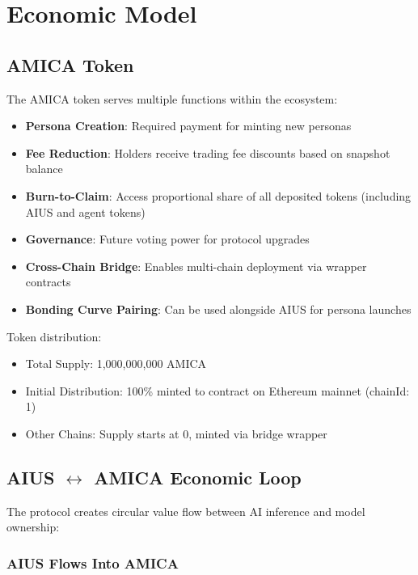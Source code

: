 \documentclass{article}
\begin{document}
\section{Economic Model}

\subsection{AMICA Token}

The AMICA token serves multiple functions within the ecosystem:

\begin{itemize}
    \item \textbf{Persona Creation}: Required payment for minting new personas
    \item \textbf{Fee Reduction}: Holders receive trading fee discounts based on snapshot balance
    \item \textbf{Burn-to-Claim}: Access proportional share of all deposited tokens (including AIUS and agent tokens)
    \item \textbf{Governance}: Future voting power for protocol upgrades
    \item \textbf{Cross-Chain Bridge}: Enables multi-chain deployment via wrapper contracts
    \item \textbf{Bonding Curve Pairing}: Can be used alongside AIUS for persona launches
\end{itemize}

Token distribution:
\begin{itemize}
    \item Total Supply: 1,000,000,000 AMICA
    \item Initial Distribution: 100\% minted to contract on Ethereum mainnet (chainId: 1)
    \item Other Chains: Supply starts at 0, minted via bridge wrapper
\end{itemize}

\subsection{AIUS $\leftrightarrow$ AMICA Economic Loop}

The protocol creates circular value flow between AI inference and model ownership:

\subsubsection{AIUS Flows Into AMICA}
\end{document}

